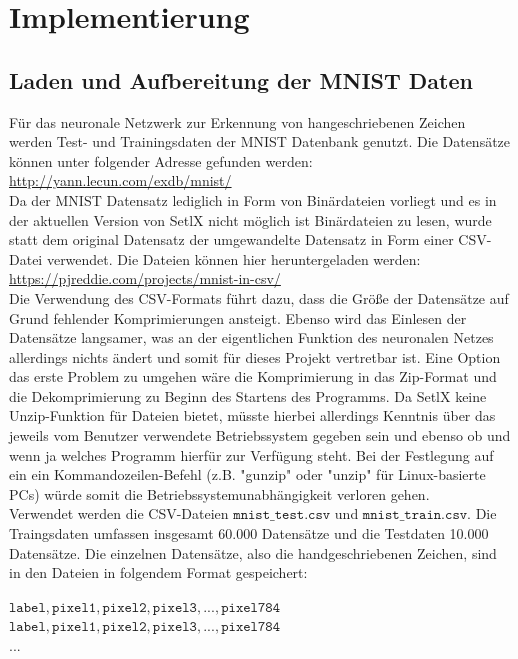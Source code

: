 \chapter{Implementierung}

\section{Laden und Aufbereitung der MNIST Daten}
Für das neuronale Netzwerk zur Erkennung von hangeschriebenen Zeichen werden Test- und Trainingsdaten der MNIST Datenbank genutzt. Die Datensätze können unter folgender Adresse gefunden werden: 
\\[0.2cm]
\hspace*{1.3cm}
\href{http://yann.lecun.com/exdb/mnist/}{http://yann.lecun.com/exdb/mnist/}
\\[0.2cm]
Da der MNIST Datensatz lediglich in Form von Binärdateien vorliegt und es in der aktuellen Version von SetlX nicht möglich ist Binärdateien zu lesen, wurde statt dem original Datensatz der umgewandelte Datensatz in Form einer CSV-Datei verwendet. Die Dateien können hier heruntergeladen werden:
\\[0.2cm]
\hspace*{1.3cm}
\href{https://pjreddie.com/projects/mnist-in-csv/}{https://pjreddie.com/projects/mnist-in-csv/}
\\[0.2cm]
Die Verwendung des CSV-Formats führt dazu, dass die Größe der Datensätze auf Grund fehlender Komprimierungen ansteigt. Ebenso wird das Einlesen der Datensätze langsamer, was an der eigentlichen Funktion des neuronalen Netzes allerdings nichts ändert und somit für dieses Projekt vertretbar ist. Eine Option das erste Problem zu umgehen wäre die Komprimierung in das Zip-Format und die Dekomprimierung zu Beginn des Startens des Programms. Da SetlX keine Unzip-Funktion für Dateien bietet, müsste hierbei allerdings Kenntnis über das jeweils vom Benutzer verwendete Betriebssystem gegeben sein und ebenso ob und wenn ja welches Programm hierfür zur Verfügung steht. Bei der Festlegung auf ein ein Kommandozeilen-Befehl (z.B. "gunzip" oder "unzip" für Linux-basierte PCs) würde somit die Betriebssystemunabhängigkeit verloren gehen.\\
Verwendet werden die CSV-Dateien $\mathtt{mnist\_test.csv}$ und $\mathtt{mnist\_train.csv}$. Die Traingsdaten umfassen insgesamt 60.000 Datensätze und die Testdaten 10.000 Datensätze. 
Die einzelnen Datensätze, also die handgeschriebenen Zeichen, sind in den Dateien in folgendem Format gespeichert:
\begin{center}
	$\mathtt{label, pixel1, pixel2, pixel3, ..., pixel784}$ \\
	$\mathtt{label, pixel1, pixel2, pixel3, ..., pixel784}$ \\
	...
\end{center}
